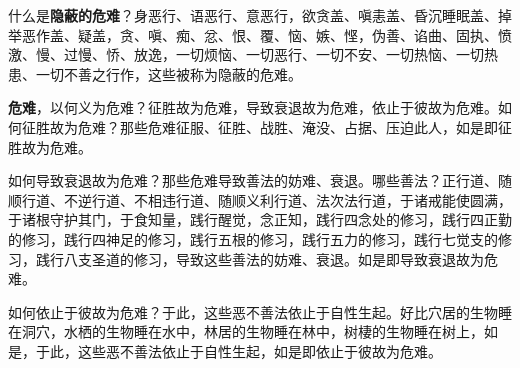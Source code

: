 什么是\textbf{隐蔽的危难}？身恶行、语恶行、意恶行，欲贪盖、嗔恚盖、昏沉睡眠盖、掉举恶作盖、疑盖，贪、嗔、痴、忿、恨、覆、恼、嫉、悭，伪善、谄曲、固执、愤激、慢、过慢、㤭、放逸，一切烦恼、一切恶行、一切不安、一切热恼、一切热患、一切不善之行作，这些被称为隐蔽的危难。


\textbf{危难}，以何义为危难？征胜故为危难，导致衰退故为危难，依止于彼故为危难。如何征胜故为危难？那些危难征服、征胜、战胜、淹没、占据、压迫此人，如是即征胜故为危难。


如何导致衰退故为危难？那些危难导致善法的妨难、衰退。哪些善法？正行道、随顺行道、不逆行道、不相违行道、随顺义利行道、法次法行道，于诸戒能使圆满，于诸根守护其门，于食知量，践行醒觉，念正知，践行四念处的修习，践行四正勤的修习，践行四神足的修习，践行五根的修习，践行五力的修习，践行七觉支的修习，践行八支圣道的修习，导致这些善法的妨难、衰退。如是即导致衰退故为危难。


如何依止于彼故为危难？于此，这些恶不善法依止于自性生起。好比穴居的生物睡在洞穴，水栖的生物睡在水中，林居的生物睡在林中，树棲的生物睡在树上，如是，于此，这些恶不善法依止于自性生起，如是即依止于彼故为危难。

